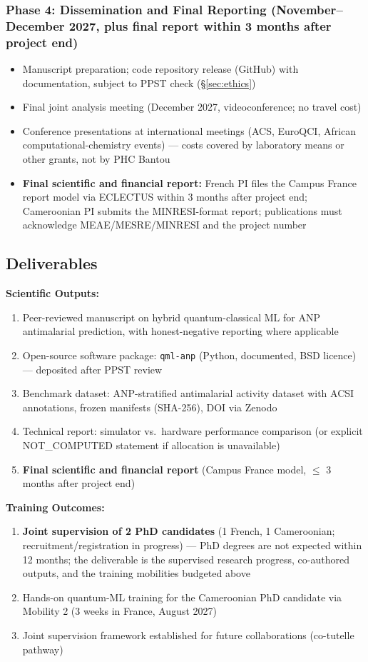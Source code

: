 \documentclass[11pt,a4paper]{article}
\begin{document}
\subsubsection{Phase 4: Dissemination and Final Reporting (November--December 2027, plus final report within 3 months after project end)}
\begin{itemize}
    \item Manuscript preparation; code repository release (GitHub) with documentation, subject to PPST check (\S\ref{sec:ethics})
    \item Final joint analysis meeting (December 2027, videoconference; no travel cost)
    \item Conference presentations at international meetings (ACS, EuroQCI, African computational-chemistry events) --- costs covered by laboratory means or other grants, not by PHC Bantou
    \item \textbf{Final scientific and financial report:} French PI files the Campus France report model via ECLECTUS within 3 months after project end; Cameroonian PI submits the MINRESI-format report; publications must acknowledge MEAE/MESRE/MINRESI and the project number
\end{itemize}

\subsection{Deliverables}

\textbf{Scientific Outputs:}
\begin{enumerate}
    \item Peer-reviewed manuscript on hybrid quantum-classical ML for ANP antimalarial prediction, with honest-negative reporting where applicable
    \item Open-source software package: \texttt{qml-anp} (Python, documented, BSD licence) --- deposited after PPST review
    \item Benchmark dataset: ANP-stratified antimalarial activity dataset with ACSI annotations, frozen manifests (SHA-256), DOI via Zenodo
    \item Technical report: simulator vs.\ hardware performance comparison (or explicit NOT\_COMPUTED statement if allocation is unavailable)
    \item \textbf{Final scientific and financial report} (Campus France model, $\leq$ 3 months after project end)
\end{enumerate}

\textbf{Training Outcomes:}
\begin{enumerate}
    \item \textbf{Joint supervision of 2 PhD candidates} (1 French, 1 Cameroonian; recruitment/registration in progress) --- PhD degrees are not expected within 12 months; the deliverable is the supervised research progress, co-authored outputs, and the training mobilities budgeted above
    \item Hands-on quantum-ML training for the Cameroonian PhD candidate via Mobility 2 (3 weeks in France, August 2027)
    \item Joint supervision framework established for future collaborations (co-tutelle pathway)
\end{enumerate}
\end{document}
